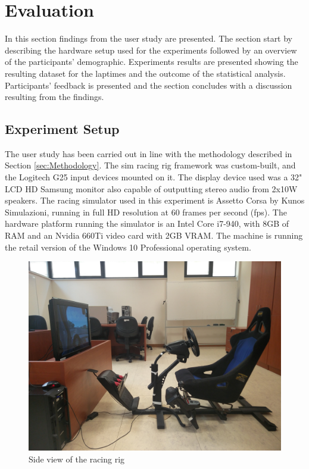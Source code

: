 \documentclass{sig-alternate}
\begin{document}
{\section{Evaluation} {
\label{sec:Evaluation}

In this section findings from the user study are presented. The section start by describing the hardware setup used for the experiments followed by an overview of the participants' demographic. Experiments results are presented showing the resulting dataset for the laptimes and the outcome of the statistical analysis. Participants' feedback is presented and the section concludes with a discussion resulting from the findings.

\subsection{Experiment Setup}
The user study has been carried out in line with the methodology described in Section \ref{sec:Methodology}. The sim racing rig framework was custom-built, and the Logitech G25 input devices mounted on it. The display device used was a 32" LCD HD Samsung monitor also capable of outputting stereo audio from 2x10W speakers. The racing simulator used in this experiment is Assetto Corsa by Kunos Simulazioni, running in full HD resolution at 60 frames per second (fps). The hardware platform running the simulator is an Intel Core i7-940, with 8GB of RAM and an Nvidia 660Ti video card with 2GB VRAM. The machine is running the retail version of the Windows 10 Professional operating system.

\begin{figure}[!htb]
	\centering
	\begin{minipage}{0.45\textwidth}
		\centering
		\includegraphics[width=\textwidth]{images/RacingRig}
	\end{minipage}\hfill
	\caption[Side view of the racing rig]{Side view of the racing rig}
	\label{sec:eval-simRacingRig}
\end{figure}

}}
\end{document}
